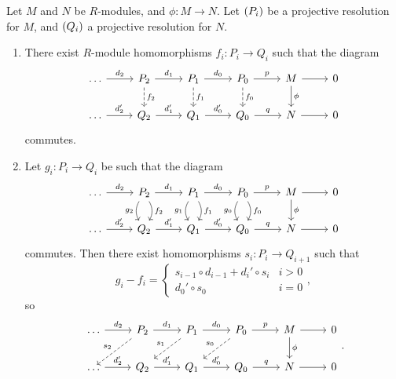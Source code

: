 \begin{proposition}
\label{prop:projectiveresolution}
Let $ M $ and $ N $ be $ R $-modules, and $ \phi : M \to N $. Let $ \br{P_i} $ be a projective resolution for $ M $, and $ \br{Q_i} $ a projective resolution for $ N $.
\begin{enumerate}
\item There exist $ R $-module homomorphisms $ f_i : P_i \to Q_i $ such that the diagram
$$
\begin{tikzcd}
\dots \arrow{r}{d_2} & P_2 \arrow{r}{d_1} \arrow[dashed]{d}{f_2} & P_1 \arrow{r}{d_0} \arrow[dashed]{d}{f_1} & P_0 \arrow{r}{p} \arrow[dashed]{d}{f_0} & M \arrow{r} \arrow{d}{\phi} & 0 \\
\dots \arrow{r}{d_2'} & Q_2 \arrow{r}{d_1'} & Q_1 \arrow{r}{d_0'} & Q_0 \arrow{r}{q} & N \arrow{r} & 0
\end{tikzcd}
$$
commutes.
\item Let $ g_i : P_i \to Q_i $ be such that the diagram
$$
\begin{tikzcd}
\dots \arrow{r}{d_2} & P_2 \arrow{r}{d_1} \arrow[bend right=30, swap]{d}{g_2} \arrow[bend left=30]{d}{f_2} & P_1 \arrow{r}{d_0} \arrow[bend right=30, swap]{d}{g_1} \arrow[bend left=30]{d}{f_1} & P_0 \arrow{r}{p} \arrow[bend right=30, swap]{d}{g_0} \arrow[bend left=30]{d}{f_0} & M \arrow{r} \arrow{d}{\phi} & 0 \\
\dots \arrow{r}{d_2'} & Q_2 \arrow{r}{d_1'} & Q_1 \arrow{r}{d_0'} & Q_0 \arrow{r}{q} & N \arrow{r} & 0
\end{tikzcd}
$$
commutes. Then there exist homomorphisms $ s_i : P_i \to Q_{i + 1} $ such that
$$ g_i - f_i =
\begin{cases}
s_{i - 1} \circ d_{i - 1} + d_i' \circ s_i & i > 0 \\
d_0' \circ s_0 & i = 0
\end{cases},
$$
so
$$
\begin{tikzcd}
\dots \arrow{r}{d_2} & P_2 \arrow{r}{d_1} \arrow[dashed, swap]{dl}{s_2} & P_1 \arrow{r}{d_0} \arrow[dashed, swap]{dl}{s_1} & P_0 \arrow{r}{p} \arrow[dashed, swap]{dl}{s_0} & M \arrow{r} \arrow{d}{\phi} & 0 \\
\dots \arrow{r}{d_2'} & Q_2 \arrow{r}{d_1'} & Q_1 \arrow{r}{d_0'} & Q_0 \arrow{r}{q} & N \arrow{r} & 0
\end{tikzcd}.
$$
\end{enumerate}
\end{proposition}

\pagebreak

